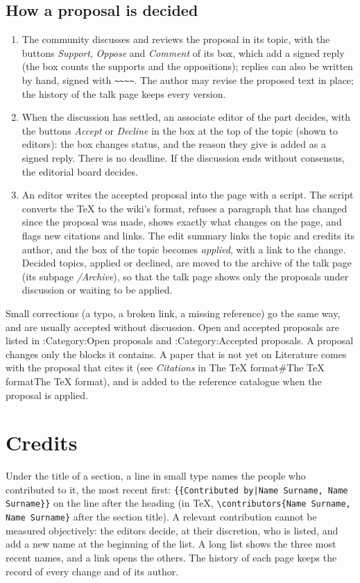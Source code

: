 \documentclass[11pt]{article}
\theoremstyle{definition}
\theoremstyle{remark}
\newcommand{\wikilink}[2]{\ifx\relax#2\relax#1\else#2\fi}
\newcommand{\nowikicode}[1]{\texttt{\frenchspacing#1}}
\begin{document}
\subsection{How a proposal is decided}
\begin{enumerate}
  \item The community discusses and reviews the proposal in its topic, with the buttons \emph{Support}, \emph{Oppose} and \emph{Comment} of its box, which add a signed reply (the box counts the supports and the oppositions); replies can also be written by hand, signed with \nowikicode{\textasciitilde{}\textasciitilde{}\textasciitilde{}\textasciitilde{}}. The author may revise the proposed text in place; the history of the talk page keeps every version.
  \item When the discussion has settled, an associate editor of the part decides, with the buttons \emph{Accept} or \emph{Decline} in the box at the top of the topic (shown to editors): the box changes status, and the reason they give is added as a signed reply. There is no deadline. If the discussion ends without consensus, the editorial board decides.
  \item An editor writes the accepted proposal into the page with a script. The script converts the TeX to the wiki's format, refuses a paragraph that has changed since the proposal was made, shows exactly what changes on the page, and flags new citations and links. The edit summary links the topic and credits its author, and the box of the topic becomes \emph{applied}, with a link to the change. Decided topics, applied or declined, are moved to the archive of the talk page (its subpage \emph{/Archive}), so that the talk page shows only the proposals under discussion or waiting to be applied.
\end{enumerate}
Small corrections (a typo, a broken link, a missing reference) go the same way, and are usually accepted without discussion. Open and accepted proposals are listed in \wikilink{:Category:Open proposals}{} and \wikilink{:Category:Accepted proposals}{}.
A proposal changes only the blocks it contains. A paper that is not yet on \wikilink{Literature}{} comes with the proposal that cites it (see \emph{Citations} in \wikilink{\#The TeX format}{The TeX format}), and is added to the reference catalogue when the proposal is applied.

\section{Credits}
Under the title of a section, a line in small type names the people who contributed to it, the most recent first: \nowikicode{\{\{Contributed by|\allowbreak{}Name Surname, Name Surname\}\allowbreak{}\}} on the line after the heading (in TeX, \nowikicode{\textbackslash{}contributors\{Name Surname, Name Surname\}} after the section title). A relevant contribution cannot be measured objectively: the editors decide, at their discretion, who is listed, and add a new name at the beginning of the list. A long list shows the three most recent names, and a link opens the others. The history of each page keeps the record of every change and of its author.
\end{document}

